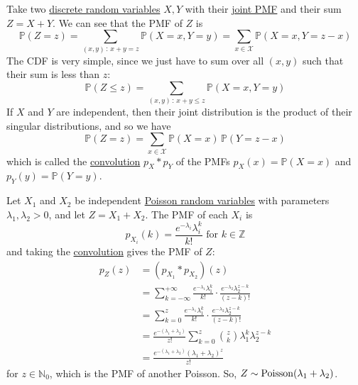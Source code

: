   \begin{definition}
    \label{def:sums-of-discrete-random-variables}
    Take two \hyperref[def:discrete-random-variable]{discrete random variables} $X, Y$ with their \hyperref[def:joint-pmf]{joint PMF} and their sum $Z = X + Y$. We can see that the PMF of $Z$ is 
    \begin{equation}
      \mathbb{P}(Z = z) = \sum_{(x, y) \,:\, x + y = z} \mathbb{P}(X = x, Y = y) = \sum_{x \in \mathcal{X}} \mathbb{P}(X = x, Y = z - x)
    \end{equation}
    The CDF is very simple, since we just have to sum over all $(x, y)$ such that their sum is less than $z$: 
    \begin{equation}
      \mathbb{P}(Z \leq z) = \sum_{(x, y) \,:\, x + y \leq z} \mathbb{P}(X = x, Y = y)
    \end{equation}
    If $X$ and $Y$ are independent, then their joint distribution is the product of their singular distributions, and so we have 
    \begin{equation}
      \mathbb{P}(Z = z) = \sum_{x \in \mathcal{X}} \mathbb{P}(X = x) \, \mathbb{P}(Y = z - x)
    \end{equation}
    which is called the \hyperref[real-thm:convolution]{convolution} $p_X \ast p_Y$ of the PMFs $p_X (x) = \mathbb{P}(X = x)$ and $p_Y (y) = \mathbb{P}(Y = y)$. 
  \end{definition}

  \begin{example}
    \label{ex:sums-of-poisson-rvs}
    Let $X_1$ and $X_2$ be independent \hyperref[def:poisson-random-variable]{Poisson random variables} with parameters $\lambda_1, \lambda_2 > 0$, and let $Z = X_1 + X_2$. The PMF of each $X_i$ is 
    \begin{equation}
      p_{X_i} (k) = \frac{e^{-\lambda_i} \lambda_i^k}{k!} \text{ for } k \in \mathbb{Z}
    \end{equation}
    and taking the \hyperref[real-thm:convolution]{convolution} gives the PMF of $Z$: 
    \begin{align*}
      p_Z (z) & = (p_{X_1} \ast p_{X_2}) (z) \\
      & = \sum_{k=-\infty}^{+\infty} \frac{e^{-\lambda_1} \lambda_1^k}{k!} \cdot \frac{e^{-\lambda_2} \lambda_2^{z - k}}{(z - k)!} \\
      & = \sum_{k=0}^{z} \frac{e^{-\lambda_1} \lambda_1^k}{k!} \cdot \frac{e^{-\lambda_2} \lambda_2^{z - k}}{(z - k)!} \\ 
      & = \frac{e^{-(\lambda_1 + \lambda_2)}}{z!} \sum_{k=0}^z \binom{z}{k} \lambda_1^k \lambda_2^{z - k} \\
      & = \frac{e^{-(\lambda_1 + \lambda_2)} (\lambda_1 + \lambda_2)^z}{z!} 
    \end{align*}
    for $z \in \mathbb{N}_0$, which is the PMF of another Poisson. So, $Z \sim \operatorname{Poisson}(\lambda_1 + \lambda_2)$. 
  \end{example}

